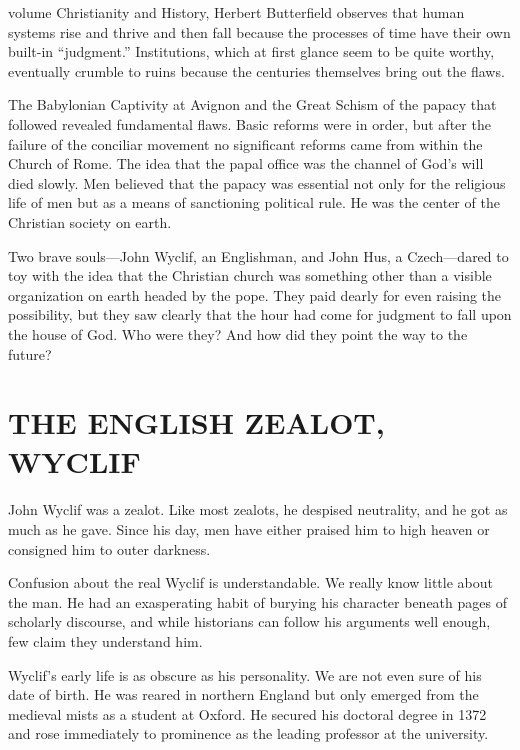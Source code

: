 
 volume Christianity and History, Herbert Butterfield observes
that human systems rise and thrive and then fall because the processes of time have their own
built-in “judgment.” Institutions, which at first glance seem to be quite worthy, eventually crumble
to ruins because the centuries themselves bring out the flaws.

The Babylonian Captivity at Avignon and the Great Schism of the papacy that followed revealed
fundamental flaws. Basic reforms were in order, but after the failure of the conciliar movement no
significant reforms came from within the Church of Rome. The idea that the papal office was the
channel of God’s will died slowly. Men believed that the papacy was essential not only for the
religious life of men but as a means of sanctioning political rule. He was the center of the
Christian society on earth.

Two brave souls—John Wyclif, an Englishman, and John Hus, a Czech—dared to toy with the idea that
the Christian church was something other than a visible organization on earth headed by the pope.
They paid dearly for even raising the possibility, but they saw clearly that the hour had come for
judgment to fall upon the house of God. Who were they? And how did they point the way to the future?

\section{THE ENGLISH ZEALOT, WYCLIF}

John Wyclif was a zealot. Like most zealots, he despised neutrality, and he got as much as he gave.
Since his day, men have either praised him to high heaven or consigned him to outer darkness.

Confusion about the real Wyclif is understandable. We really know little about the man. He had an
exasperating habit of burying his character beneath pages of scholarly discourse, and while
historians can follow his arguments well enough, few claim they understand him.

Wyclif’s early life is as obscure as his personality. We are not even sure of his date of birth. He
was reared in northern England but only emerged from the medieval mists as a student at Oxford. He
secured his doctoral degree in 1372 and rose immediately to prominence as the leading professor at
the university.

